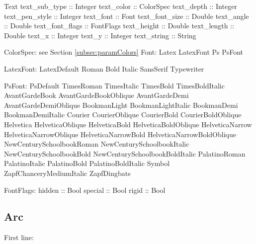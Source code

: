 \documentclass[10pt, a4paper]{article}
\begin{document}
Text	 
text\_sub\_type :: Integer
text\_color :: ColorSpec
text\_depth :: Integer
text\_pen\_style :: Integer
text\_font :: Font
text\_font\_size :: Double
text\_angle :: Double
text\_font\_flags :: FontFlags
text\_height :: Double
text\_length :: Double
text\_x :: Integer
text\_y :: Integer
text\_string :: String

ColorSpec: see Section \ref{subsec:paramColors}
Font:
Latex LatexFont	 
Ps PsFont	 


LatexFont:
LatexDefault	 
Roman	 
Bold	 
Italic	 
SansSerif	 
Typewriter	 


PsFont:
PsDefault	 
TimesRoman	 
TimesItalic	 
TimesBold	 
TimesBoldItalic	 
AvantGardeBook	 
AvantGardeBookOblique	 
AvantGardeDemi	 
AvantGardeDemiOblique	 
BookmanLight	 
BookmanLightItalic	 
BookmanDemi	 
BookmanDemiItalic	 
Courier	 
CourierOblique	 
CourierBold	 
CourierBoldOblique	 
Helvetica	 
HelveticaOblique	 
HelveticaBold	 
HelveticaBoldOblique	 
HelveticaNarrow	 
HelveticaNarrowOblique	 
HelveticaNarrowBold	 
HelveticaNarrowBoldOblique	 
NewCenturySchoolbookRoman	 
NewCenturySchoolbookItalic	 
NewCenturySchoolbookBold	 
NewCenturySchoolbookBoldItalic	 
PalatinoRoman	 
PalatinoItalic	 
PalatinoBold	 
PalatinoBoldItalic	 
Symbol	 
ZapfChanceryMediumItalic	 
ZapfDingbats	 


FontFlags:
hidden :: Bool
special :: Bool
rigid :: Bool





\subsection{Arc}\label{subsec:arc}

First line:
\end{document}
